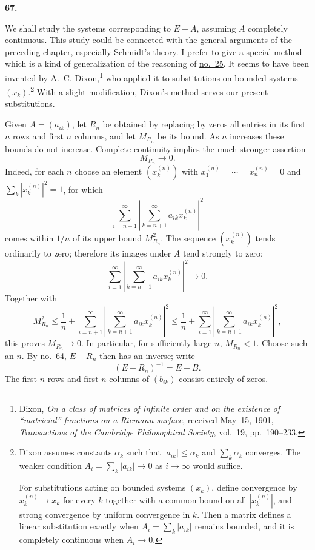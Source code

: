\documentclass[
  paper=b5,
  fontsize=13pt,
  twoside=true,
  open=any,
  bookmarkpackage=false,
  chapterprefix=true,
  headings=normal
]{scrbook}
\theoremstyle{definition}
\newcommand{\numberedparagraph}[1]{%
  \par\medskip\phantomsection\label{sec:#1}%
  \noindent\textbf{#1.}\enspace
}
\begin{document}
\numberedparagraph{67}
We shall study the systems corresponding to $E-A$, assuming $A$ completely
continuous. This study could be connected with the general arguments of
the \hyperref[chap:3]{preceding chapter}, especially Schmidt's theory. I prefer to give a
special method which is a kind of generalization of the reasoning of
\hyperref[sec:25]{no.~25}. It seems to have been invented by A.~C. Dixon,\footnote{Dixon, \emph{On a class
of matrices of infinite order and on the existence of ``matricial''
functions on a Riemann surface}, received May~15, 1901,
\emph{Transactions of the Cambridge Philosophical Society}, vol.~19,
pp.~190--233.} who applied it to substitutions on bounded systems
$(x_k)$.\footnote{Dixon assumes constants $\alpha_k$ such that
$|a_{ik}|\leq\alpha_k$ and $\sum_k\alpha_k$ converges. The weaker condition
$A_i=\sum_k|a_{ik}|\to0$ as $i\to\infty$ would suffice.

For substitutions acting on bounded systems $(x_k)$, define convergence by
$x_k^{(n)}\to x_k$ for every $k$ together with a common bound on all
$|x_k^{(n)}|$, and strong convergence by uniform convergence in $k$. Then
a matrix defines a linear substitution exactly when
$A_i=\sum_k|a_{ik}|$ remains bounded, and it is completely continuous when
$A_i\to0$.} With a slight modification, Dixon's method serves our
present substitutions.

Given $A=(a_{ik})$, let $R_n$ be obtained by replacing by zeros all entries
in its first $n$ rows and first $n$ columns, and let $M_{R_n}$ be its bound.
As $n$ increases these bounds do not increase. Complete continuity implies
the much stronger assertion
\[
  M_{R_n}\longrightarrow0.
\]
Indeed, for each $n$ choose an element $(x_k^{(n)})$ with
$x_1^{(n)}=\cdots=x_n^{(n)}=0$ and $\sum_k|x_k^{(n)}|^2=1$, for which
\[
 \sum_{i=n+1}^{\infty}
 \left|\sum_{k=n+1}^{\infty}a_{ik}x_k^{(n)}\right|^2
\]
comes within $1/n$ of its upper bound $M_{R_n}^2$.
The sequence $(x_k^{(n)})$ tends ordinarily to zero; therefore its images
under $A$ tend strongly to zero:
\[
 \sum_{i=1}^{\infty}
 \left|\sum_{k=n+1}^{\infty}a_{ik}x_k^{(n)}\right|^2\longrightarrow0.
\]
Together with
\[
 M_{R_n}^2\leq\frac1n+
 \sum_{i=n+1}^{\infty}
 \left|\sum_{k=n+1}^{\infty}a_{ik}x_k^{(n)}\right|^2
 \leq\frac1n+
 \sum_{i=1}^{\infty}
 \left|\sum_{k=n+1}^{\infty}a_{ik}x_k^{(n)}\right|^2,
\]
this proves $M_{R_n}\to0$. In particular, for sufficiently large $n$,
$M_{R_n}<1$. Choose such an $n$. By \hyperref[sec:64]{no.~64}, $E-R_n$
then has an inverse; write
\[
  (E-R_n)^{-1}=E+B.
\]
The first $n$ rows and first $n$ columns of $(b_{ik})$ consist entirely of
zeros.
\end{document}
